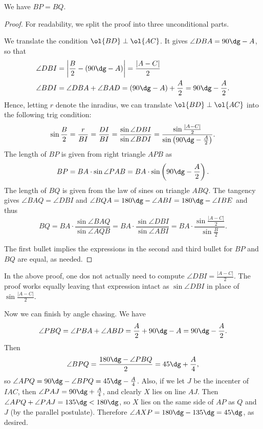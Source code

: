 \begin{claim*}
  We have $BP=BQ$.
\end{claim*}
\begin{proof}
  For readability, we split the proof into three unconditional parts.
  \begin{itemize}
    \ii We translate the condition $\ol{BD} \perp \ol{AC}$.
    It gives $\angle DBA = 90\dg - A$, so that
    \begin{align*}
      \angle DBI &= \left| \frac B2 - (90\dg - A) \right| = \frac{|A-C|}{2} \\
      \angle BDI &= \angle DBA + \angle BAD = (90\dg-A) + \frac A2 = 90\dg - \frac A2.
    \end{align*}
    Hence, letting $r$ denote the inradius, we can translate $\ol{BD} \perp \ol{AC}$
    into the following trig condition:
    \[ \sin \frac B2 = \frac{r}{BI} = \frac{DI}{BI}
      = \frac{\sin \angle DBI}{\sin \angle BDI}
      = \frac{\sin\frac{|A-C|}{2}}{\sin\left(90\dg-\frac A2\right)}. \]
    \ii The length of $BP$ is given from right triangle $APB$ as
    \[ BP = BA \cdot \sin \angle PAB = BA \cdot \sin\left( 90\dg-\frac A2 \right). \]
    \ii The length of $BQ$ is given from the law of sines on triangle $ABQ$.
    The tangency gives $\angle BAQ = \angle DBI$ and
    $\angle BQA = 180\dg - \angle ABI = 180\dg - \angle IBE$ and thus
    \[ BQ = BA \cdot \frac{\sin \angle BAQ}{\sin \angle AQB}
      = BA \cdot \frac{\sin \angle DBI}{\sin \angle ABI}
      = BA \cdot \frac{\sin \frac{|A-C|}{2}}{\sin \frac B2}. \]
  \end{itemize}
  The first bullet implies the expressions in the second and third bullet
  for $BP$ and $BQ$ are equal, as needed.
\end{proof}
\begin{remark*}
  In the above proof, one dos not actually need to compute $\angle DBI = \frac{|A-C|}{2}$.
  The proof works equally leaving that expression intact as $\sin \angle DBI$
  in place of $\sin \frac{|A-C|}{2}$.
\end{remark*}

Now we can finish by angle chasing. We have
\[ \angle PBQ = \angle PBA + \angle ABD = \frac{A}{2} + 90\dg - A =
  90\dg - \frac{A}{2}.
\]
Then
\[
  \angle BPQ = \frac{180\dg - \angle PBQ}{2} = 45\dg + \frac{A}{4},
\]
so $\angle APQ = 90\dg - \angle BPQ = 45\dg - \frac{A}{4}$.
Also, if we let $J$ be the incenter of $IAC$,
then $\angle PAJ = 90 \dg + \frac{A}{4}$, and clearly $X$ lies on line $AJ$.
Then $\angle APQ + \angle PAJ = 135 \dg < 180 \dg$,
so $X$ lies on the same side of $AP$ as $Q$ and $J$ (by the parallel postulate).
Therefore $\angle AXP = 180 \dg - 135 \dg = 45 \dg$, as desired.

